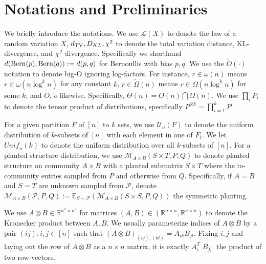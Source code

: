 \documentclass[final,12pt]{colt2023} %
\newcommand\1[1]{\mathbb{I}_{\left\{#1\right\}}}
\begin{document}




\newpage
\appendix

\section{Notations and Preliminaries}\label{sec: prelim}

We briefly introduce the notations. We use $\mathcal{L}(X)$ to denote the law of a random variation $X$, $d_{\rm TV}, D_{KL}, \chi^2$ to denote the total variation distance, KL-divergence, and $\chi^2$ divergence. Specifically we shorthand $d({\rm Bern}(p), {\rm Bern}(q)):=d(p, q)$ for Bernoullis with bias $p, q$. We use the $\tilde O(\cdot)$ notation to denote big-O ignoring log-factors. For instance, $r\in \tilde \omega(n)$ means $r\in \omega(n\log^{k} n)$ for any constant $k$, $r\in \tilde \Omega(n)$ means $r\in \Omega(n\log^{k} n)$ for some $k$, and $\tilde O$, $\tilde o$ likewise. Specifically, $\tilde \Theta(n)=\tilde O(n)\bigcap\tilde \Omega(n)$. We use $\prod_i P_i$ to denote the tensor product of distributions, specifically $P^{\otimes k}=\prod_{i=1}^{k} P$.

\spac For a given partition $F$ of $[n]$ to $k$ sets, we use $\mathcal{U}_n(F)$ to denote the uniform distribution of $k$-subsets of $[n]$ with each element in one of $F_i$. We let $\textit{Unif}_n(k)$ to denote the uniform distribution over all $k$-subsets of $[n]$. For a planted structure distribution, we use $\mathcal{M}_{A\times B}(S\times T, P, Q)$ to denote planted structure on community $A\times B$ with a planted submatrix $S\times T$ where the in-community entries sampled from $P$ and otherwise from $Q$. Specifically, if $A=B$ and $S=T$ are unknown sampled from $\mathcal{P}$, denote $\mathcal{M}_{A\times B}(\mathcal{P}, P, Q):=\mathbb{E}_{S\sim \mathcal{P}}\left(\mathcal{M}_{A\times B}(S\times S, P, Q)\right)$ the symmetric planting.

\spac We use $A\otimes B\in \mathbb{R}^{n^2\times n^2}$ for matrices $(A, B)\in (\mathbb{R}^{n\times n}, \mathbb{R}^{n\times n})$ to denote the Kronecker product between $A, B$. We usually parameterize indices of $A\otimes B$ by a pair $(ij): i, j\in [n]$ such that $(A\otimes B)_{(ij), (kl)}=A_{ik}B_{jl}$. Fixing $i, j$ and laying out the row of $A\otimes B$ as a $n\times n$ matrix, it is exactly $A_{i, \cdot}^{T}B_{j, \cdot}$ the product of two row-vectors. 
\end{document}
